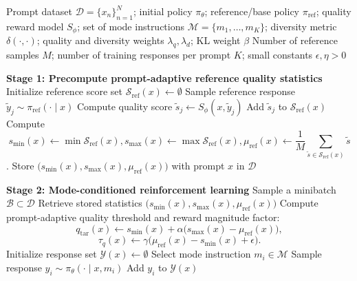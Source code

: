 \begin{breakablealgorithm}
\caption{\textsc{\method}: Mode-conditioned Diversity Alignment}
\label{alg:moda}
\begin{algorithmic}[1]
\Require Prompt dataset $\mathcal{D}=\{x_n\}_{n=1}^N$; initial policy $\pi_{\theta}$; reference/base policy $\pi_{\mathrm{ref}}$; quality reward model $S_{\phi}$; set of mode instructions $\mathcal{M}=\{m_1,\ldots,m_K\}$; diversity metric $\delta(\cdot,\cdot)$; quality and diversity weights $\lambda_q,\lambda_d$; KL weight $\beta$
\Require Number of reference samples $M$; number of training responses per prompt $K$; small constants $\epsilon,\eta>0$
\Statex

\State \textbf{Stage 1: Precompute prompt-adaptive reference quality statistics}
    \State Initialize reference score set $\mathcal{S}_{\mathrm{ref}}(x) \gets \emptyset$
        \State Sample reference response $\tilde{y}_j \sim \pi_{\mathrm{ref}}(\cdot \mid x)$
        \State Compute quality score $\tilde{s}_j \gets S_{\phi}(x,\tilde{y}_j)$
        \State Add $\tilde{s}_j$ to $\mathcal{S}_{\mathrm{ref}}(x)$
    \EndFor
    \State Compute
    \[s_{\min}(x) \gets \min \mathcal{S}_{\mathrm{ref}}(x),
    s_{\max}(x) \gets \max \mathcal{S}_{\mathrm{ref}}(x),
    \mu_{\mathrm{ref}}(x) \gets \frac{1}{M}\sum_{\tilde{s}\in \mathcal{S}_{\mathrm{ref}}(x)} \tilde{s}\].
    \State Store $\bigl(s_{\min}(x),s_{\max}(x),\mu_{\mathrm{ref}}(x)\bigr)$ with prompt $x$ in $\mathcal{D}$
\EndFor
\Statex

\State \textbf{Stage 2: Mode-conditioned reinforcement learning}
    \State Sample a minibatch $\mathcal{B}\subset \mathcal{D}$
        \State Retrieve stored statistics $\bigl(s_{\min}(x),s_{\max}(x),\mu_{\mathrm{ref}}(x)\bigr)$
        \State Compute prompt-adaptive quality threshold and reward magnitude factor:
        \[
        q_{\mathrm{tar}}(x)
        \gets
        s_{\min}(x)+\alpha\bigl(s_{\max}(x)-\mu_{\mathrm{ref}}(x)\bigr),
        \]
        \[
        \tau_q(x)
        \gets
        \gamma\bigl(\mu_{\mathrm{ref}}(x)-s_{\min}(x)+\epsilon\bigr).
        \]
        \State Initialize response set $\mathcal{Y}(x)\gets \emptyset$
            \State Select mode instruction $m_i \in \mathcal{M}$
            \State Sample response
            $y_i \sim \pi_{\theta}(\cdot \mid x,m_i)$
            \State Add $y_i$ to $\mathcal{Y}(x)$
        \EndFor
        \Statex


\end{algorithmic}
\end{breakablealgorithm}
